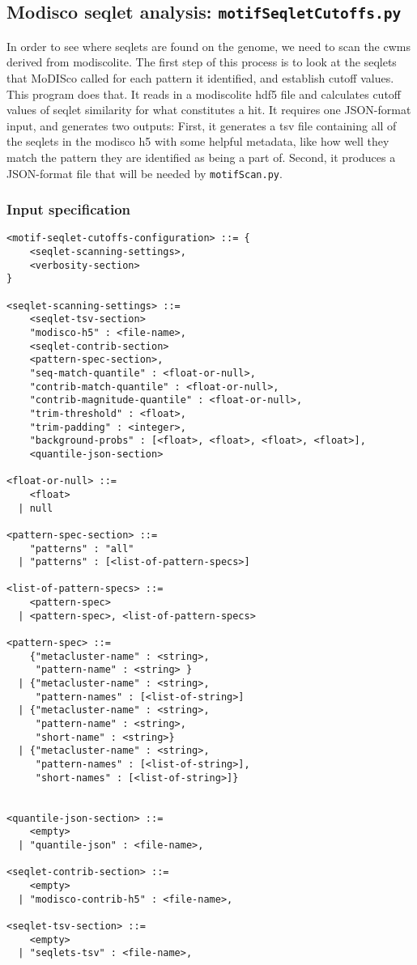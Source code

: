 \documentclass{article}
\begin{document}
\newpage

\subsection{Modisco seqlet analysis: \texttt{motifSeqletCutoffs.py}}
In order to see where seqlets are found on the genome, we need to scan the cwms derived from
modiscolite.
The first step of this process is to look at the seqlets that MoDISco called for each pattern it
identified, and establish cutoff values.
This program does that.
It reads in a modiscolite hdf5 file and calculates cutoff values of seqlet similarity for what
constitutes a hit.
It requires one JSON-format input, and generates two outputs: First, it generates a tsv file
containing all of the seqlets in the modisco h5 with some helpful metadata, like how well they
match the pattern they are identified as being a part of.
Second, it produces a JSON-format file that will be needed by \texttt{motifScan.py}.

\subsubsection{Input specification}
\begin{lstlisting}
<motif-seqlet-cutoffs-configuration> ::= {
    <seqlet-scanning-settings>,
    <verbosity-section>
}

<seqlet-scanning-settings> ::=
    <seqlet-tsv-section>
    "modisco-h5" : <file-name>,
    <seqlet-contrib-section>
    <pattern-spec-section>,
    "seq-match-quantile" : <float-or-null>,
    "contrib-match-quantile" : <float-or-null>,
    "contrib-magnitude-quantile" : <float-or-null>,
    "trim-threshold" : <float>,
    "trim-padding" : <integer>,
    "background-probs" : [<float>, <float>, <float>, <float>],
    <quantile-json-section>

<float-or-null> ::=
    <float>
  | null

<pattern-spec-section> ::=
    "patterns" : "all"
  | "patterns" : [<list-of-pattern-specs>]

<list-of-pattern-specs> ::=
    <pattern-spec>
  | <pattern-spec>, <list-of-pattern-specs>

<pattern-spec> ::=
    {"metacluster-name" : <string>,
     "pattern-name" : <string> }
  | {"metacluster-name" : <string>,
     "pattern-names" : [<list-of-string>]
  | {"metacluster-name" : <string>,
     "pattern-name" : <string>,
     "short-name" : <string>}
  | {"metacluster-name" : <string>,
     "pattern-names" : [<list-of-string>],
     "short-names" : [<list-of-string>]}


<quantile-json-section> ::=
    <empty>
  | "quantile-json" : <file-name>,

<seqlet-contrib-section> ::=
    <empty>
  | "modisco-contrib-h5" : <file-name>,

<seqlet-tsv-section> ::=
    <empty>
  | "seqlets-tsv" : <file-name>,
\end{lstlisting}
\end{document}
